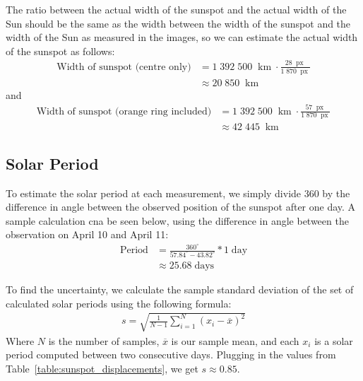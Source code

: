\documentclass[11pt]{article}
\DeclareMathOperator{\km}{km}
\DeclareMathOperator{\px}{px}
\begin{document}
The ratio between the actual width of the sunspot and the actual width of the Sun should be the same as the width between the width of the sunspot and the width of the Sun as measured in the images, so we can estimate the actual width of the sunspot as follows:
\begin{equation}
\label{eqn:sunspot_width_centre}
\begin{split}
	\textrm{Width of sunspot (centre only)}
	&= 1\;392\;500\;\km \cdot \frac{28\;\px}{1\;870\;\px}\\
	&\approx 20\;850\;\km
\end{split}
\end{equation}
and
\begin{equation}
\label{eqn:sunspot_width_ring}
\begin{split}
	\textrm{Width of sunspot (orange ring included)}
	&= 1\;392\;500\;\km \cdot \frac{57\;\px}{1\;870\;\px}\\
	&\approx 42\;445\;\km
\end{split}
\end{equation}


\subsection{Solar Period}
To estimate the solar period at each measurement, we simply divide 360 by the difference in angle between the observed position of the sunspot after one day.
A sample calculation cna be seen below, using the difference in angle between the observation on April 10 and April 11:
\begin{equation}
\begin{split}
	\textrm{Period} &= \frac{360^\circ}{57.84^\circ - 43.82^\circ} * 1\;\textrm{day}\\
			&\approx 25.68\;\textrm{days}
\end{split}
\end{equation}

To find the uncertainty, we calculate the sample standard deviation of the set of calculated solar periods using the following formula:
\begin{align*}
	s = \sqrt{\frac{1}{N-1}\sum^N_{i=1} \left(x_i-\overline{x}\right)^2}
\end{align*}
Where $N$ is the number of samples, $\overline{x}$ is our sample mean, and each $x_i$ is a solar period computed between two consecutive days.
Plugging in the values from Table~\ref{table:sunspot_displacements}, we get $s \approx 0.85$.
\end{document}
